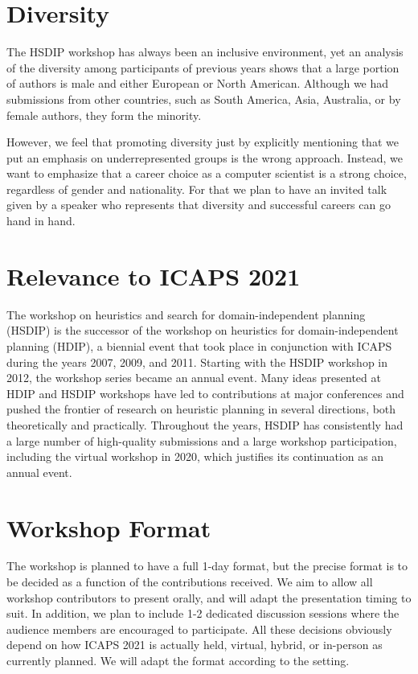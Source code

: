 \documentclass[10pt]{article}
\begin{document}
\section*{Diversity}
The HSDIP workshop has always been an inclusive environment, yet an analysis
of the diversity among participants of previous years shows that a large portion
of authors is male and either European or North American. Although we had
submissions from other countries, such as South America, Asia, Australia, or by
female authors, they form the minority.

However, we feel that promoting diversity just by explicitly mentioning that we
put an emphasis on underrepresented groups is the wrong approach. Instead, we
want to emphasize that a career choice as a computer scientist is a strong choice,
regardless of gender and nationality. For that we plan to have an invited talk
given by a speaker who represents that diversity and successful careers can go
hand in hand. 




\section*{Relevance to ICAPS 2021}

The workshop on heuristics and search for domain-independent planning (HSDIP) is
the successor of the workshop on heuristics for domain-independent planning
(HDIP), a biennial event that took place in conjunction with ICAPS during the
years 2007, 2009, and 2011. Starting with the HSDIP workshop in 2012, the
workshop series became an annual event.
Many ideas presented at HDIP and HSDIP workshops have led to contributions at major 
conferences and pushed the frontier of research on heuristic planning in several 
directions, both theoretically and practically. Throughout the years, HSDIP has 
consistently had a large number of high-quality submissions and a large workshop 
participation, including the virtual workshop in 2020, which justifies its 
continuation as an annual event.

\section*{Workshop Format}

The workshop is planned to have a full 1-day format, but the precise
format is to be decided as a function of the contributions received.
We aim to allow all workshop contributors to present orally, and will
adapt the presentation timing to suit. In addition, we plan to include
1-2 dedicated discussion sessions where the audience members are
encouraged to participate. All these decisions obviously depend on how ICAPS 2021
is actually held, virtual, hybrid, or in-person as currently planned. We
will adapt the format according to the setting.
\end{document}
